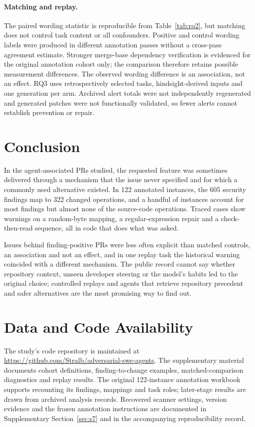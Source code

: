 \documentclass[acmsmall,screen,nonacm]{acmart}
\begin{document}
\paragraph{Matching and replay.} The paired wording statistic is reproducible from Table~\ref{tab:rq2}, but matching does not control task content or all confounders. Positive and control wording labels were produced in different annotation passes without a cross-pass agreement estimate. Stronger merge-base dependency verification is evidenced for the original annotation cohort only; the comparison therefore retains possible measurement differences. The observed wording difference is an association, not an effect. RQ3 uses retrospectively selected tasks, hindsight-derived inputs and one generation per arm. Archived alert totals were not independently regenerated and generated patches were not functionally validated, so fewer alerts cannot establish prevention or repair.

\section{Conclusion}

In the agent-associated PRs studied, the requested feature was sometimes delivered through a mechanism that the issue never specified and for which a commonly used alternative existed. In 122 annotated instances, the 605 security findings map to 322 changed operations, and a handful of instances account for most findings but almost none of the source-code operations. Traced cases show warnings on a random-byte mapping, a regular-expression repair and a check-then-read sequence, all in code that does what was asked.

Issues behind finding-positive PRs were less often explicit than matched controls, an association and not an effect, and in one replay task the historical warning coincided with a different mechanism. The public record cannot say whether repository context, unseen developer steering or the model's habits led to the original choice; controlled replays and agents that retrieve repository precedent and safer alternatives are the most promising way to find out.

\section*{Data and Code Availability}

The study's code repository is maintained at \url{https://github.com/Stralb/adversarial-swe-agents}. The supplementary material documents cohort definitions, finding-to-change examples, matched-comparison diagnostics and replay results. The original 122-instance annotation workbook supports recounting its findings, mappings and task roles; later-stage results are drawn from archived analysis records. Recovered scanner settings, version evidence and the frozen annotation instructions are documented in Supplementary Section~\ref{sec:s7} and in the accompanying reproducibility record.
\end{document}
